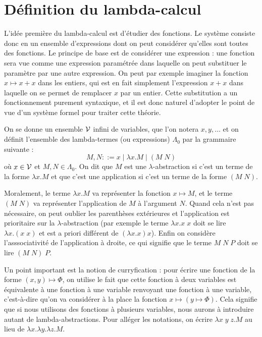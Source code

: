 \section{Définition du lambda-calcul}

L'idée première du lambda-calcul est d'étudier des fonctions. Le système consiste donc en un ensemble d'expressions dont on peut considérer qu'elles sont toutes des fonctions. Le principe de base est de considérer une expression : une fonction sera vue comme une expression paramétrée dans laquelle on peut substituer le paramètre par une autre expression. On peut par exemple imaginer la fonction $x\mapsto x+x$ dans les entiers, qui est en fait simplement l'expression $x+x$ dans laquelle on se permet de remplacer $x$ par un entier. Cette substitution a un fonctionnement purement syntaxique, et il est donc naturel d'adopter le point de vue d'un système formel pour traiter cette théorie.

\begin{defi}
    On se donne un ensemble $\mathcal V$ infini de variables, que l'on notera $x,y,\ldots$ et on définit l'ensemble des lambda-termes (ou expressions) $\Lambda_0$ par la grammaire suivante : $$M,N ::= x \mid \lambda x.M\mid (M\;N)$$ où $x\in\mathcal V$ et $M,N\in\Lambda_0$. On dit que $M$ est une $\lambda$-abstraction si c'est un terme de la forme $\lambda x.M$ et que c'est une application si c'est un terme de la forme $(M\;N)$.
\end{defi}

Moralement, le terme $\lambda x.M$ va représenter la fonction $x\mapsto M$, et le terme $(M\;N)$ va représenter l'application de $M$ à l'argument $N$. Quand cela n'est pas nécessaire, on peut oublier les parenthèses extérieures et l'application est prioritaire sur la $\lambda$-abstraction (par exemple le terme $\lambda x.x\;x$ doit se lire $\lambda x.(x\;x)$ et est a priori différent de $(\lambda x.x)x$). Enfin on considère l'asssociativité de l'application à droite, ce qui signifie que le terme $M\;N\;P$ doit se lire $(M\;N)\;P$.

Un point important est la notion de curryfication : pour écrire une fonction de la forme $(x,y)\mapsto \Phi$, on utilise le fait que cette fonction à deux variables est équivalente à une fonction à une variable renvoyant une fonction à une variable, c'est-à-dire qu'on va considérer à la place la fonction $x\mapsto (y\mapsto \Phi)$. Cela signifie que si nous utilisons des fonctions à plusieurs variables, nous aurons à introduire autant de lambda-abstractions. Pour alléger les notations, on écrire $\lambda x\;y\;z.M$ au lieu de $\lambda x.\lambda y.\lambda z.M$.

